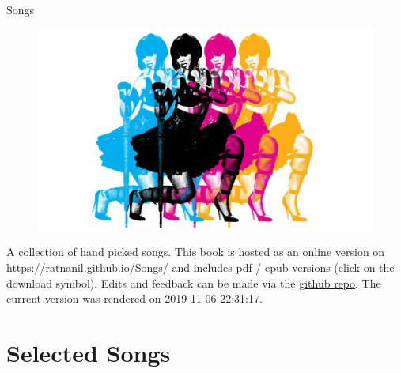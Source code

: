 \documentclass[]{book}
\title{}
\author{}
\date{}
\begin{document}

\begin{titlepage}
\begin{center}
  

\end{center}
\vspace{1.5cm}
\begin{center}

{\LARGE Songs}

\end{center}
 \vspace{1cm}

\begin{figure}[htbp]
  \centering
  \includegraphics[width=1\textwidth]{misc/title.png}
  \label{titelbild}
\end{figure}

\begin{center}
\textbf{}


\end{center} 

\vspace{1.0cm}


\end{titlepage}

{
\setcounter{tocdepth}{1}
\tableofcontents
}
A collection of hand picked songs. This book is hosted as an online version on \url{https://ratnanil.github.io/Songs/} and includes pdf / epub versions (click on the download symbol). Edits and feedback can be made via the \href{https://github.com/ratnanil/songs}{github repo}. The current version was rendered on 2019-11-06 22:31:17.

\hypertarget{selected-songs}{%
\chapter{Selected Songs}\label{selected-songs}}
\end{document}
